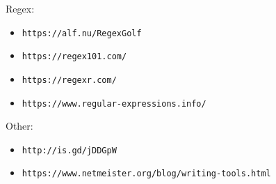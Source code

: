 \documentclass[xga]{xdvislides}
\begin{document}
Regex:
\begin{itemize}
	\item \verb+https://alf.nu/RegexGolf+
	\item \verb+https://regex101.com/+
	\item \verb+https://regexr.com/+
	\item \verb+https://www.regular-expressions.info/+
\end{itemize}

Other:
\begin{itemize}
	\item \verb+http://is.gd/jDDGpW+
	\item \verb+https://www.netmeister.org/blog/writing-tools.html+
\end{itemize}
\end{document}

